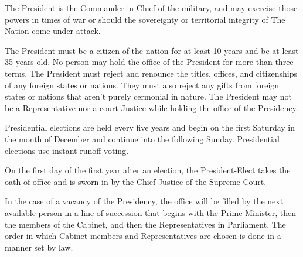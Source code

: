 \documentclass{report}
\newcommand{\nation}{The Nation}
\begin{document}
    The President is the Commander in Chief of the military, and may exercise
    those powers in times of war or should the sovereignty or territorial
    integrity of \nation{} come under attack.

    The President must be a citizen of the nation for at least 10 years and be
    at least 35 years old. No person may hold the office of the President for
    more than three terms. The President must reject and renounce the titles,
    offices, and citizenships of any foreign states or nations. They must also
    reject any gifts from foreign states or nations that aren't purely
    cermonial in nature. The President may not be a Representative nor a court
    Justice while holding the office of the Presidency.

    Presidential elections are held every five years and begin on the first
    Saturday in the month of December and continue into the following Sunday.
    Presidential elections use instant-runoff voting.

    On the first day of the first year after an election, the President-Elect
    takes the oath of office and is sworn in by the Chief Justice of the
    Supreme Court.

    In the case of a vacancy of the Presidency, the office will be filled by the
    next available person in a line of succession that begins with the Prime
    Minister, then the members of the Cabinet, and then the Representatives in
    Parliament. The order in which Cabinet members and Representatives are
    chosen is done in a manner set by law.
\end{document}
